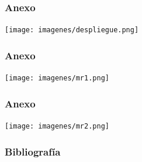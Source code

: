 \documentclass[12pt]{beamer}
\begin{document}
\begin{frame}
	\frametitle{Anexo}
	\begin{center}
		\texttt{[image: imagenes/despliegue.png]}	
	\end{center}
\end{frame}

\begin{frame}
	\frametitle{Anexo}
	\begin{center}
		\texttt{[image: imagenes/mr1.png]}	
	\end{center}
\end{frame}

\begin{frame}
	\frametitle{Anexo}
	\begin{center}
		\texttt{[image: imagenes/mr2.png]}	
	\end{center}
\end{frame}

\begin{frame}
	\frametitle{Bibliografía}
	 

\end{frame}
	
\end{document}
